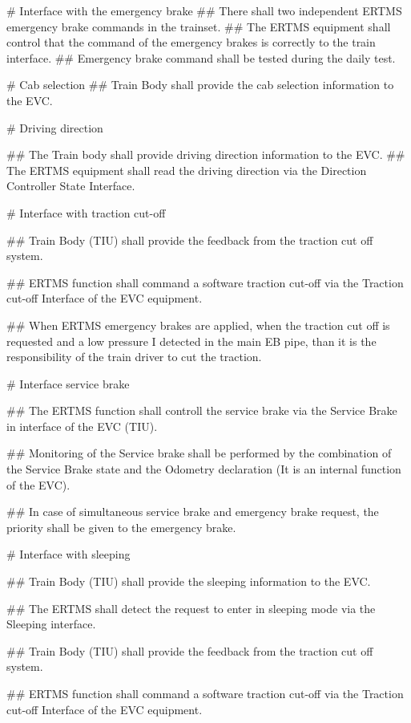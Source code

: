 \documentclass{template/openetcs_article}
\begin{document}
\begin{easylist}
# Interface with the emergency brake
## There shall two independent ERTMS emergency brake commands in the trainset.
## The ERTMS equipment shall control that the command of the emergency brakes is correctly to the train interface.
## Emergency brake command shall be tested during the daily test.


# Cab selection
## Train Body shall provide the cab selection information to the EVC.


# Driving direction

## The Train body shall provide driving direction information to the EVC.
## The ERTMS equipment shall read the driving direction via the Direction Controller State Interface.



# Interface with traction cut-off



## Train Body (TIU) shall provide the feedback from the traction cut off system.

## ERTMS function shall command a software traction cut-off via the Traction cut-off Interface of the EVC equipment.

## When ERTMS emergency brakes are applied, when the traction cut off is requested and a low pressure I detected in the main EB pipe, than it is the responsibility of the train driver to cut the traction.


# Interface service brake


## The ERTMS function shall controll the service brake via the Service Brake in interface of the EVC (TIU).

## Monitoring of the Service brake shall be performed by the combination of the Service Brake state and the Odometry declaration (It is an internal function of the EVC).

## In case of simultaneous service brake and emergency brake request, the priority shall be given to the emergency brake.


# Interface with sleeping

## Train Body (TIU) shall provide the sleeping information to the EVC.

## The ERTMS shall detect the request to enter in sleeping mode via the Sleeping interface.

## Train Body (TIU) shall provide the feedback from the traction cut off system.

## ERTMS function shall command a software traction cut-off via the Traction cut-off Interface of the EVC equipment.


\end{easylist}
\end{document}
